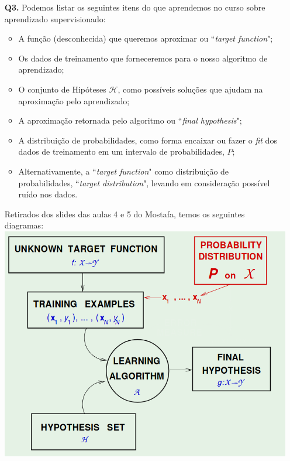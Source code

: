 \documentclass[12pt]{article}
\begin{document}
\begin{enumerate}
\item [\textbf{Q3.}] Podemos listar os seguintes itens do que aprendemos no curso sobre aprendizado supervisionado:
	\begin{itemize}
		\item A função (desconhecida) que queremos aproximar ou ``\textit{target function}";
		\item Os dados de treinamento que forneceremos para o nosso algoritmo de aprendizado;
		\item O conjunto de Hipóteses $\mathcal{H}$, como possíveis soluções que ajudam na aproximação pelo aprendizado;
		\item A aproximação retornada pelo algoritmo ou ``\textit{final hypothesis}";
		\item A distribuição de probabilidades, como forma encaixar ou fazer o \textit{fit} dos dados de treinamento em um intervalo de probabilidades, $P$;
		\item Alternativamente, a ``\textit{target function}" como distribuição de probabilidades, ``\textit{target distribution}", levando em consideração possível ruído nos dados.
	\end{itemize}
	Retirados dos slides das aulas 4 e 5 do Mostafa, temos os seguintes diagramas:\\
\includegraphics[scale=.3]{"images/SupervisedLearning-a"}

\end{enumerate}
\end{document}

